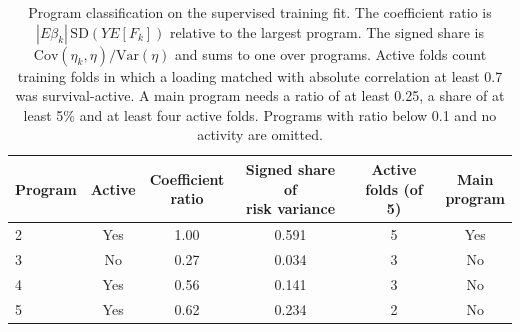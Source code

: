 \begin{table}[!htb]
\centering
\small
\begin{tabular}{lccccc}
\toprule
Program & Active & \shortstack{Coefficient\\ratio} & \shortstack{Signed share of\\risk variance} & \shortstack{Active\\folds (of 5)} & \shortstack{Main\\program} \\
\midrule
2 & Yes & 1.00 & 0.591 & 5 & Yes \\
3 & No & 0.27 & 0.034 & 3 & No \\
4 & Yes & 0.56 & 0.141 & 3 & No \\
5 & Yes & 0.62 & 0.234 & 2 & No \\
\bottomrule
\end{tabular}
\caption{Program classification on the supervised training fit. The coefficient ratio is $|E\beta_k|\,\mathrm{SD}(YE[F_k])$ relative to the largest program. The signed share is $\mathrm{Cov}(\eta_k,\eta)/\mathrm{Var}(\eta)$ and sums to one over programs. Active folds count training folds in which a loading matched with absolute correlation at least 0.7 was survival-active. A main program needs a ratio of at least 0.25, a share of at least 5\% and at least four active folds. Programs with ratio below 0.1 and no activity are omitted.}
\label{tab:program-rule}
\end{table}
